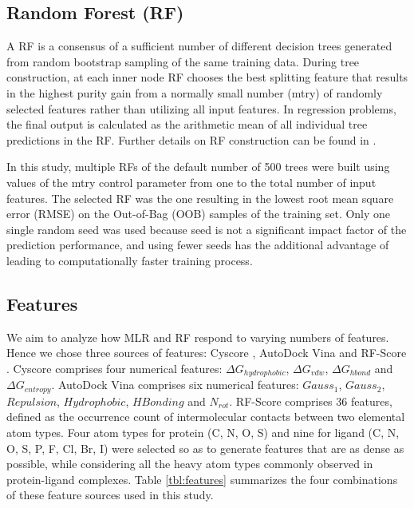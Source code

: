 \documentclass[10pt,conference,compsocconf]{IEEEtran}
\begin{document}
\subsection{Random Forest (RF)}

A RF \cite{1309} is a consensus of a sufficient number of different decision trees generated from random bootstrap sampling of the same training data. During tree construction, at each inner node RF chooses the best splitting feature that results in the highest purity gain from a normally small number (mtry) of randomly selected features rather than utilizing all input features. In regression problems, the final output is calculated as the arithmetic mean of all individual tree predictions in the RF. Further details on RF construction can be found in \cite{564,1362}.

In this study, multiple RFs of the default number of 500 trees were built using values of the mtry control parameter from one to the total number of input features. The selected RF was the one resulting in the lowest root mean square error (RMSE) on the Out-of-Bag (OOB) samples of the training set. Only one single random seed was used because seed is not a significant impact factor of the prediction performance, and using fewer seeds has the additional advantage of leading to computationally faster training process.

\subsection{Features}

We aim to analyze how MLR and RF respond to varying numbers of features. Hence we chose three sources of features: Cyscore \cite{1372}, AutoDock Vina \cite{595} and RF-Score \cite{564}. Cyscore comprises four numerical features: $\Delta G_{hydrophobic}$, $\Delta G_{vdw}$, $\Delta G_{hbond}$ and $\Delta G_{entropy}$. AutoDock Vina comprises six numerical features: $Gauss_1$, $Gauss_2$, $Repulsion$, $Hydrophobic$, $HBonding$ and $N_{rot}$. RF-Score comprises 36 features, defined as the occurrence count of intermolecular contacts between two elemental atom types. Four atom types for protein (C, N, O, S) and nine for ligand (C, N, O, S, P, F, Cl, Br, I) were selected so as to generate features that are as dense as possible, while considering all the heavy atom types commonly observed in protein-ligand complexes. Table \ref{tbl:features} summarizes the four combinations of these feature sources used in this study.
\end{document}
